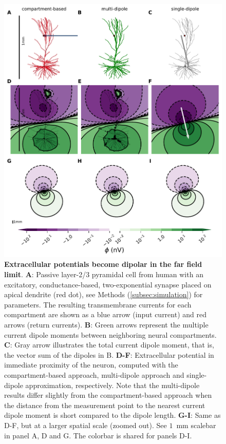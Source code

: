 \documentclass[preprint,10pt,authoryear]{elsarticle}
\begin{document}
	
\begin{figure}[H]
	\centering
	\includegraphics[width=1.0\textwidth]{fig_dipole_field_passiveTrue_single_syn481}
	\caption{\textbf{Extracellular potentials become dipolar in the far field limit}. 
		\textbf{A}: Passive layer-2/3 pyramidal cell from human \citep{EYAL2016} with an excitatory, conductance-based, two-exponential synapse placed on apical dendrite (red dot), see Methods (\ref{subsec:simulation}) for parameters. The resulting transmembrane currents for each compartment are shown as a blue arrow (input current) and red arrows (return currents).
		\textbf{B}: Green arrows represent the multiple current dipole moments between neighboring neural compartments.
		\textbf{C}: Gray arrow illustrates the total current dipole moment, that is, the vector sum of the dipoles in B.
	\textbf{D-F}: Extracellular potential in immediate proximity of the neuron, computed with the compartment-based approach, multi-dipole approach and single-dipole approximation, respectively. Note that the multi-dipole results differ slightly from the compartment-based approach when the distance from the measurement point to the nearest current dipole moment is short compared to the dipole length.
\textbf{G-I}: Same as D-F, but at a larger spatial scale (zoomed out). See $1$~mm scalebar in panel A, D and G. The colorbar is shared for panels D-I.
}
\label{fig:dipole_field}
\end{figure}
\end{document}
